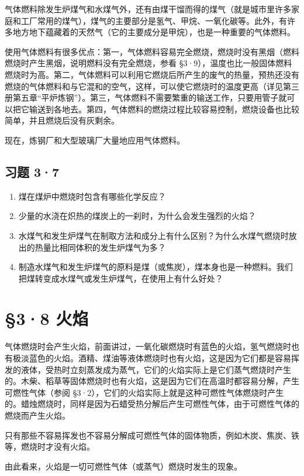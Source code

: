 气体燃料除发生炉煤气和水煤气外，还有由煤干馏而得的煤气（就是城市里许多家庭和工厂常用的煤气），煤气的主要部分是氢气、甲烷、一氧化碳等。此外，有许多地方地下蕴藏着的天然气（它的主要成分是甲烷），也是一种重要的气体燃料。

使用气体燃料有很多优点：第一，气体燃料容易完全燃烧，燃烧时没有黑烟（燃料燃烧时产生黑烟，说明燃料没有完全燃烧，参看
§3·9），温度也比一般固体燃料燃烧时为高。第二，气体燃料可以利用它燃烧后所产生的废气的热量，预热还没有燃烧的气体燃料和与它混和的空气，这样，可以使它燃烧时的温度更高（详见第三册第五章``平炉炼钢''）。第三，气体燃料不需要繁重的输送工作，只要用管子就可以把它输送到各地去。第四，气体燃料的燃烧过程比较容易控制，燃烧设备也比较简单，并且燃烧后没有灰剩余。

现在，炼钢厂和大型玻璃厂大量地应用气体燃料。

\subsection{习题 3·7}

\begin{enumerate}
\item
  煤在煤炉中燃烧时包含有哪些化学反应？
\item
  少量的水浇在炽热的煤炭上的一刹时，为什么会发生强烈的火焰？
\item
  水煤气和发生炉煤气在制取方法和成分上有什么区别？为什么水煤气燃烧时放出的热量比相同体积的发生炉煤气为多？
\item
  制造水煤气和发生炉煤气的原料是煤（或焦炭），煤本身也是一种燃料。我们把煤转变成水煤气或发生炉煤气，在使用上有什么好处？
\end{enumerate}

\section{§3·8 火焰}

气体燃烧时会产生火焰，前面讲过，一氧化碳燃烧时有蓝色的火焰，氢气燃烧时也有极淡蓝色的火焰。酒精、煤油等液体燃烧时也有火焰，这是因为它们都是容易挥发的液体，受热时立刻蒸发成为蒸气，它们的火焰实际上是它们蒸气燃烧时产生的。木柴、稻草等固体燃烧时也有火焰，这是因为它们在高温时都容易分解，产生可燃性气体（参阅
§3·2），它们的火焰实际上就是这种可燃性气体燃烧时产生的。蜡烛燃烧时，同样是因为石蜡受热分解后产生可燃性气体，由于可燃性气体的燃烧而产生火焰。

只有那些不容易挥发也不容易分解成可燃性气体的固体物质，例如木炭、焦炭、铁等，燃烧时才没有火焰。

由此看来，火焰是一切可燃性气体（或蒸气）燃烧时发生的现象。

